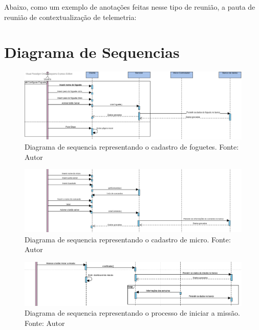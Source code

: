 \begin{apendicesenv}
Abaixo, como um exemplo de anotações feitas nesse tipo de reunião, a pauta de reunião de contextualização de telemetria:

%


\chapter{Diagrama de Sequencias}
\label{diagrama_sequencia}
\begin{figure}[htb]
    \centering
    \includegraphics[width=1\textwidth, angle=0]{figuras/diagrama_sequencia_cadastro_foguete.png}
    \caption{Diagrama de sequencia representando o cadastro de foguetes. Fonte: Autor}
    \label{fig:Diagrama_sequencia_cadastr_foguete}
\end{figure}

\begin{figure}[htb]
    \centering
    \includegraphics[width=1\textwidth, angle=0]{figuras/diagrama_sequencia_cadastro_micro.png}
    \caption{Diagrama de sequencia representando o cadastro de micro. Fonte: Autor}
    \label{fig:Diagrama_sequencia_cadastro_micro}
\end{figure}

\begin{figure}[htb]
    \centering
    \includegraphics[width=1\textwidth, angle=0]{figuras/diagrama_sequencia_missao.png}
    \caption{Diagrama de sequencia representando o processo de iniciar a missão. Fonte: Autor}
    \label{fig:Diagrama_sequencia_missao}
\end{figure}


\end{apendicesenv}
